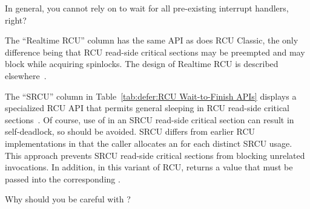 \QuickQuiz{}
	In general, you cannot rely on  to
	wait for all pre-existing interrupt handlers,
	right?
 \QuickQuizEnd

The ``Realtime RCU'' column has the same API as does
RCU Classic, the only difference being that RCU read-side critical
sections may be preempted and may block while acquiring spinlocks.
The design of Realtime RCU is described
elsewhere~\cite{PaulEMcKenney2007PreemptibleRCU}.

The ``SRCU'' column in
Table~\ref{tab:defer:RCU Wait-to-Finish APIs}
displays a specialized RCU API that permits
general sleeping in RCU read-side critical
sections~\cite{PaulEMcKenney2006c}.
Of course,
use of  in an SRCU read-side
critical section can result in
self-deadlock, so should be avoided.
SRCU differs from earlier RCU implementations in that the caller
allocates an  for each distinct SRCU
usage.
This approach prevents SRCU read-side critical sections from blocking
unrelated  invocations.
In addition, in this variant of RCU, 
returns a value that must be passed into the corresponding
.

\QuickQuiz{}
	Why should you be careful with ?
 \QuickQuizEnd

